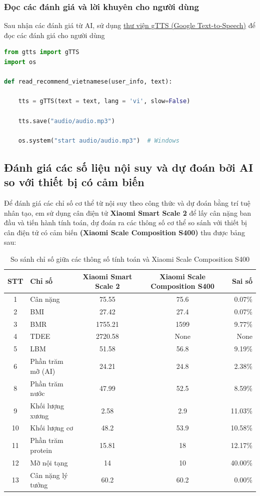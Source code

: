 \subsubsection{Đọc các đánh giá và lời khuyên cho người dùng}
Sau nhận các đánh giá từ AI, sử dụng \href{https://pypi.org/project/gTTS/}{thư viện gTTS (Google Text-to-Speech)} để đọc các đánh giá cho người dùng

\begin{lstlisting}[language=python,caption={Sử dụng thư viện gTTS để đọc các đánh giá của AI}]
from gtts import gTTS
import os

def read_recommend_vietnamese(user_info, text):

    tts = gTTS(text = text, lang = 'vi', slow=False)

    tts.save("audio/audio.mp3")

    os.system("start audio/audio.mp3")  # Windows
\end{lstlisting}

\subsection{Đánh giá các số liệu nội suy và dự đoán bởi AI so với thiết bị có cảm biến}
Để đánh giá các chỉ số cơ thể từ nội suy theo công thức và dự đoán bằng trí tuệ nhân tạo, em sử dụng cân điện tử \textbf{Xiaomi Smart Scale 2} để lấy cân nặng ban đầu và tiến hành tính toán, dự đoán ra các thông số cơ thể so sánh với thiết bị cân điện tử có cảm biến \textbf{(Xiaomi Scale Composition S400)} thu được bảng sau:

\begin{table}[!htp]
\centering
\begin{tabular}{clccr}
\toprule
STT & Chỉ số & Xiaomi Smart Scale 2 & Xiaomi Scale Composition S400 & Sai số \\
\midrule
1 & Cân nặng & 75.55 & 75.6 & 0.07\% \\
2 & BMI & 27.42 & 27.4 & 0.07\% \\
3 & BMR & 1755.21 & 1599 & 9.77\% \\
4 & TDEE & 2720.58 & None &  None\\
5 & LBM & 51.58 & 56.8 & 9.19\% \\
6 & Phần trăm mỡ (AI) & 24.21 & 24.8 & 2.38\% \\
8 & Phần trăm nước & 47.99 & 52.5 & 8.59\% \\
9 & Khối lượng xương & 2.58 & 2.9 & 11.03\% \\
10 & Khối lượng cơ & 48.2 & 53.9 & 10.58\% \\
11 & Phần trăm protein & 15.81 & 18 & 12.17\% \\
12 & Mỡ nội tạng & 14 & 10 & 40.00\% \\
13 & Cân nặng lý tưởng & 60.2 & 60.2 & 0.00\% \\
\bottomrule
\end{tabular}
\caption{So sánh chỉ số giữa các thông số tính toán và Xiaomi Scale Composition S400}
\end{table}


